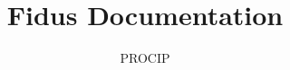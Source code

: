 \documentclass[11pt]{book}
\title{Fidus Documentation}
\author{PROCIP}
\begin{document}
\maketitle
\def\title#1{\chapter{#1}}
\tableofcontents

        
        
        
        
        
        
\end{document}
